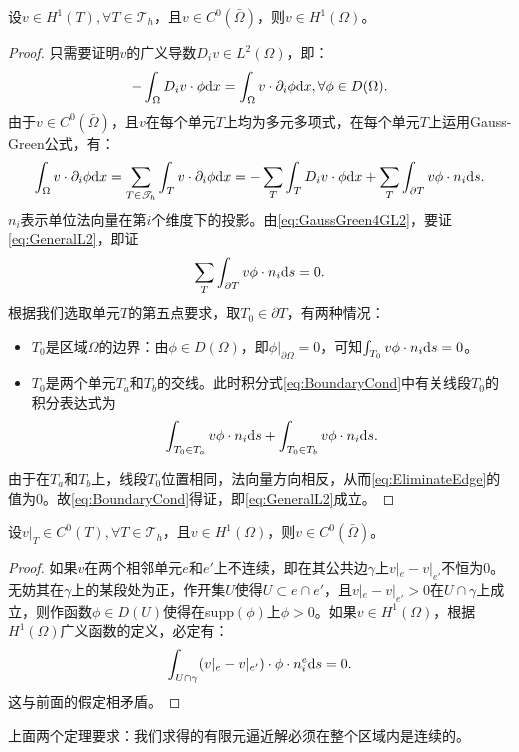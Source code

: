 \begin{theorem}
    设$v\in H^{1}(T),\forall T\in\mathscr{T}_{h}$，且$v\in C^{0}(\bar{\Omega})$，则$v\in H^{1}(\Omega)$。
\end{theorem}
\begin{proof}
    只需要证明$v$的广义导数$D_{i}v\in L^{2}(\Omega)$，即：
    \begin{equation}
        \label{eq:GeneralL2}
        -\int_{\Omega}D_{i}v\cdot\phi\mathrm{d} x=\int_{\Omega}v\cdot\partial_{i}\phi\mathrm{d} x,\forall\phi\in D(\Omega).
    \end{equation}
由于$v\in C^{0}(\bar\Omega)$，且$v$在每个单元$T$上均为多元多项式，在每个单元$T$上运用Gauss-Green公式，有：
\begin{equation}
    \label{eq:GaussGreen4GL2}
    \int_{\Omega}v\cdot\partial_{i}\phi\mathrm{d} x=\sum_{T\in\mathscr{T}_{h}}\int_{T}v\cdot\partial_{i}\phi\mathrm{d} x=-\sum_{T}\int_{T}D_{i}v\cdot\phi\mathrm{d} x+\sum_{T}\int_{\partial T}v\phi\cdot n_{i}\mathrm{d} s.
\end{equation}
$n_{i}$表示单位法向量在第$i$个维度下的投影。由\eqref{eq:GaussGreen4GL2}，要证\eqref{eq:GeneralL2}，即证
\begin{equation}
    \label{eq:BoundaryCond}
    \sum_{T}\int_{\partial T}v\phi\cdot n_{i}\mathrm{d} s=0.
\end{equation}
根据我们选取单元$T$的第五点要求，取$T_{0}\in\partial T$，有两种情况：
\begin{itemize}
    \item $T_{0}$是区域$\Omega$的边界：由$\phi\in D(\Omega)$，即$\phi|_{\partial\Omega}=0$，可知$\int_{T_{0}}v\phi\cdot n_{i}\mathrm{d} s=0$。
    \item $T_{0}$是两个单元$T_{a}$和$T_{b}$的交线。此时积分式\eqref{eq:BoundaryCond}中有关线段$T_{0}$的积分表达式为
    \begin{equation}
        \label{eq:EliminateEdge}
        \int_{T_{0}\in T_{a}}v\phi\cdot n_{i}\mathrm{d} s+\int_{T_{0}\in T_{b}}v\phi\cdot n_{i}\mathrm{d} s.
    \end{equation}
\end{itemize}
    由于在$T_{a}$和$T_{b}$上，线段$T_{0}$位置相同，法向量方向相反，从而\eqref{eq:EliminateEdge}的值为0。故\eqref{eq:BoundaryCond}得证，即\eqref{eq:GeneralL2}成立。
\end{proof}
\begin{theorem}
    设$v|_{T}\in C^{0}(T),\forall T\in\mathscr{T}_{h}$，且$v\in H^{1}(\Omega)$，则$v\in C^{0}(\bar{\Omega})$。
\end{theorem}
\begin{proof}
    如果$v$在两个相邻单元$e$和$e'$上不连续，即在其公共边$\gamma$上$v|_{e}-v|_{e'}$不恒为0。无妨其在$\gamma$上的某段处为正，作开集$U$使得$U\subset e\cap e'$，且$v|_{e}-v|_{e'}>0$在$U\cap\gamma$上成立，则作函数$\phi\in D(U)$使得在supp$(\phi)$上$\phi>0$。如果$v\in H^{1}(\Omega)$，根据$H^{1}(\Omega)$广义函数的定义，必定有：
    \begin{equation}
        \int_{U\cap\gamma}(v|_{e}-v|_{e'})\cdot\phi\cdot n_{i}^{e}\mathrm{d} s=0.
    \end{equation}
    这与前面的假定相矛盾。
\end{proof}
\begin{remark}
    上面两个定理要求：我们求得的有限元逼近解必须在整个区域内是连续的。
\end{remark}

